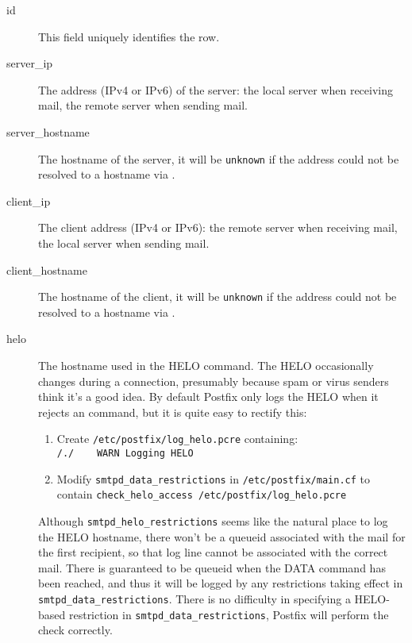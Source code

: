 \documentclass[a4paper,12pt,draft]{article}
\newcommand{\tab}[0]{%
    \hspace*{2em}%
}
\begin{document}
\begin{description}

    \item [id] This field uniquely identifies the row.

    \item [server\_ip] The \IP{} address (IPv4 or IPv6) of the server: the
        local server when receiving mail, the remote server when sending
        mail.

    \item [server\_hostname] The hostname of the server, it will be
        \texttt{unknown} if the \IP{} address could not be resolved to a
        hostname via \DNS{}\@.

    \item [client\_ip] The client \IP{} address (IPv4 or IPv6): the remote
        server when receiving mail, the local server when sending mail.

    \item [client\_hostname] The hostname of the client, it will be
        \texttt{unknown} if the \IP{} address could not be resolved to a
        hostname via \DNS{}\@.

    \item [helo] The hostname used in the HELO command.  The HELO
        occasionally changes during a connection, presumably because spam
        or virus senders think it's a good idea.  By default Postfix only
        logs the HELO when it rejects an \SMTP{} command, but it is quite
        easy to rectify this:

\label{logging helo}

        \begin{enumerate}

            \item Create \texttt{/etc/postfix/log\_helo.pcre}
                containing:\newline \tab{}\texttt{/./~~~~WARN~Logging~HELO}

            \item Modify \texttt{smtpd\_data\_restrictions} in
                \texttt{/etc/postfix/main.cf} to contain\newline
                \tab{}\texttt{check\_helo\_access~/etc/postfix/log\_helo.pcre}

        \end{enumerate}

        Although \texttt{smtpd\_helo\_restrictions} seems like the natural
        place to log the HELO hostname, there won't be a queueid associated
        with the mail for the first recipient, so that log line cannot be
        associated with the correct mail.  There is guaranteed to be
        queueid when the DATA command has been reached, and thus it will be
        logged by any restrictions taking effect in
        \texttt{smtpd\_data\_restrictions}.  There is no difficulty in
        specifying a HELO-based restriction in
        \texttt{smtpd\_data\_restrictions}, Postfix will perform the check
        correctly.


\end{description}
\end{document}
